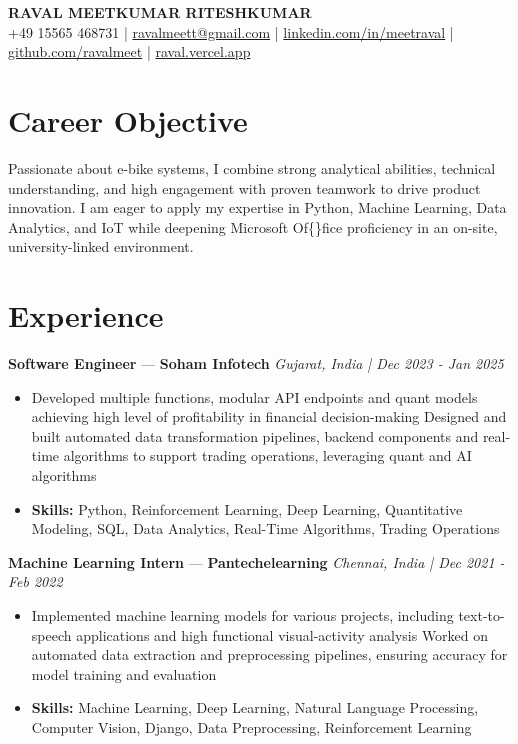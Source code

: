 \documentclass[a4paper,10pt]{article}
\begin{document}
\begin{center}
  {\Large\bfseries RAVAL MEETKUMAR RITESHKUMAR}\\[2pt]
  {\small +49 15565 468731 \;|\; \href{mailto:ravalmeett@gmail.com}{ravalmeett@gmail.com} \;|\; \href{https://www.linkedin.com/in/meetraval/}{linkedin.com/in/meetraval} \;|\; \href{https://github.com/ravalmeet}{github.com/ravalmeet} \;|\; \href{https://raval.vercel.app/}{raval.vercel.app}}
\end{center}
\vspace{-3pt}

\section*{Career Objective}
Passionate about e-bike systems, I combine strong analytical abilities, technical understanding, and high engagement with proven teamwork to drive product innovation. I am eager to apply my expertise in Python, Machine Learning, Data Analytics, and IoT while deepening Microsoft Of\{\}fice proficiency in an on-site, university-linked environment.\par

\section*{Experience}
\textbf{Software Engineer} — \textbf{Soham Infotech} \hfill \textit{Gujarat, India \;|\; Dec 2023 - Jan 2025}\par
\vspace{1pt}
\begin{itemize}
  \item Developed multiple functions, modular API endpoints and quant models achieving high level of profitability in financial decision-making Designed and built automated data transformation pipelines, backend components and real-time algorithms to support trading operations, leveraging quant and AI algorithms
  \item \textbf{Skills:} Python, Reinforcement Learning, Deep Learning, Quantitative Modeling, SQL, Data Analytics, Real-Time Algorithms, Trading Operations
\end{itemize}
\vspace{3pt}
\textbf{Machine Learning Intern} — \textbf{Pantechelearning} \hfill \textit{Chennai, India \;|\; Dec 2021 - Feb 2022}\par
\vspace{1pt}
\begin{itemize}
  \item Implemented machine learning models for various projects, including text-to-speech applications and high functional visual-activity analysis Worked on automated data extraction and preprocessing pipelines, ensuring accuracy for model training and evaluation
  \item \textbf{Skills:} Machine Learning, Deep Learning, Natural Language Processing, Computer Vision, Django, Data Preprocessing, Reinforcement Learning
\end{itemize}
\end{document}
